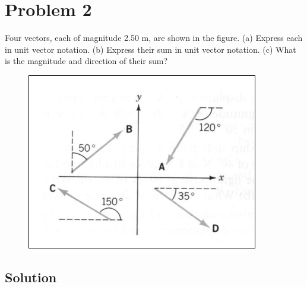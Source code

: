 \documentclass{article}
\begin{document}
\begin{figure}[ht!]
\centering
{}
\end{figure}

\newpage
\section*{Problem 2}
Four vectors, each of magnitude 2.50 m, are shown in the figure.
(a) Express each in unit vector notation.
(b) Express their sum in unit vector notation.
(c) What is the magnitude and direction of their sum?

\begin{figure}[ht]
    \centering
    \includegraphics[scale=0.5]{graph-1.png}
\end{figure}

\subsection*{Solution}
\end{document}

